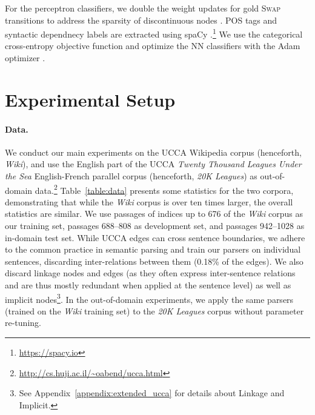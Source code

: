 \documentclass[11pt,a4paper]{article}
\newcommand{\tabref}[1]{Table~\ref{#1}}
\begin{document}
For the perceptron classifiers, we double the weight updates
for gold \textsc{Swap} transitions to address the sparsity of discontinuous nodes
\cite{maier2015discontinuous}.
POS tags and syntactic dependnecy labels are extracted using spaCy
\cite{honnibal-johnson:2015:EMNLP}.\footnote{\url{https://spacy.io}}
We use the categorical cross-entropy objective function and optimize the
NN classifiers with the Adam optimizer \cite{kingma2014adam}.

\section{Experimental Setup}\label{sec:exp_setup}

\paragraph{Data.}
We conduct our main experiments on the UCCA Wikipedia corpus (henceforth, \textit{Wiki}),
and use the English part of the UCCA \textit{Twenty Thousand Leagues Under the Sea}
English-French parallel corpus (henceforth, \textit{20K Leagues}) as
out-of-domain data.\footnote{\mbox{\url{http://cs.huji.ac.il/~oabend/ucca.html}}}
\tabref{table:data} presents some statistics for the two corpora, demonstrating that while
the \textit{Wiki} corpus is over ten times larger, the overall statistics are
similar.
We use passages of indices up to 676
of the \textit{Wiki} corpus as our training set, passages 688--808 as development set,
and passages 942--1028 as in-domain test set.
While UCCA edges can cross sentence boundaries, we adhere to the common
practice in semantic parsing and train our parsers on individual sentences,
discarding inter-relations between them (0.18\% of the edges).
We also discard linkage nodes and edges (as they often express inter-sentence
relations and are thus mostly redundant when applied at the sentence level)
as well as implicit nodes\footnote{See Appendix~\ref{appendix:extended_ucca}
for details about Linkage and Implicit.}.
In the out-of-domain experiments, we apply the same parsers
(trained on the \textit{Wiki} training set) to the \textit{20K Leagues} corpus
without parameter re-tuning.
\end{document}
